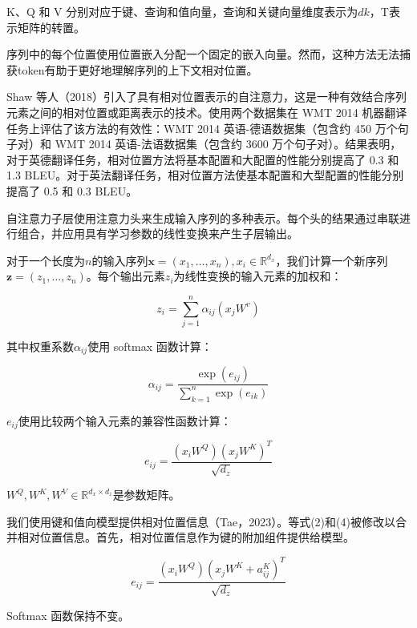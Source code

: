 K、Q 和 V 分别对应于键、查询和值向量，查询和关键向量维度表示为$dk$，T表示矩阵的转置。

序列中的每个位置使用位置嵌入分配一个固定的嵌入向量。然而，这种方法无法捕获token有助于更好地理解序列的上下文相对位置。

Shaw 等人（2018）引入了具有相对位置表示的自注意力，这是一种有效结合序列元素之间的相对位置或距离表示的技术。使用两个数据集在 WMT 2014 机器翻译任务上评估了该方法的有效性：WMT 2014 英语-德语数据集（包含约 450 万个句子对）和 WMT 2014 英语-法语数据集（包含约 3600 万个句子对）。结果表明，对于英德翻译任务，相对位置方法将基本配置和大配置的性能分别提高了 0.3 和 1.3 BLEU。对于英法翻译任务，相对位置方法使基本配置和大型配置的性能分别提高了 0.5 和 0.3 BLEU。

自注意力子层使用注意力头来生成输入序列的多种表示。每个头的结果通过串联进行组合，并应用具有学习参数的线性变换来产生子层输出。

对于一个长度为$n$的输入序列$\boldsymbol{x} = \left( x_1, \ldots, x_n \right), x_i \in \mathbb{R}^{d_x}$，我们计算一个新序列$\boldsymbol{z} = \left( z_1, \ldots, z_n \right)$。每个输出元素$z_i$为线性变换的输入元素的加权和：

\begin{equation}
  z_i = \sum_{j=1}^n \alpha_{ij} \left( x_jW^{v} \right) 
\end{equation}

其中权重系数$\alpha_{ij}$使用 softmax 函数计算：

\begin{equation}
  \alpha_{ij} = \frac{\exp \left( e_{ij} \right)}{\sum_{k=1}^n \exp \left( e_{ik} \right)}
\end{equation}

$e_{ij}$使用比较两个输入元素的兼容性函数计算：

\begin{equation}
  e_{ij} = \frac{\left( x_iW^{Q} \right) \left( x_jW^{K} \right)^T}{\sqrt{d_z}}
\end{equation}

$W^Q, W^K, W^V \in \mathbb{R}^{d_x  \times d_z}$是参数矩阵。

我们使用键和值向模型提供相对位置信息（Tae，2023）。等式(2)和(4)被修改以合并相对位置信息。首先，相对位置信息作为键的附加组件提供给模型。

\begin{equation}
  e_{ij} = \frac{\left( x_iW^{Q} \right) \left( x_jW^{K} + a_{ij}^K \right)^T}{\sqrt{d_z}}
\end{equation}

Softmax 函数保持不变。

